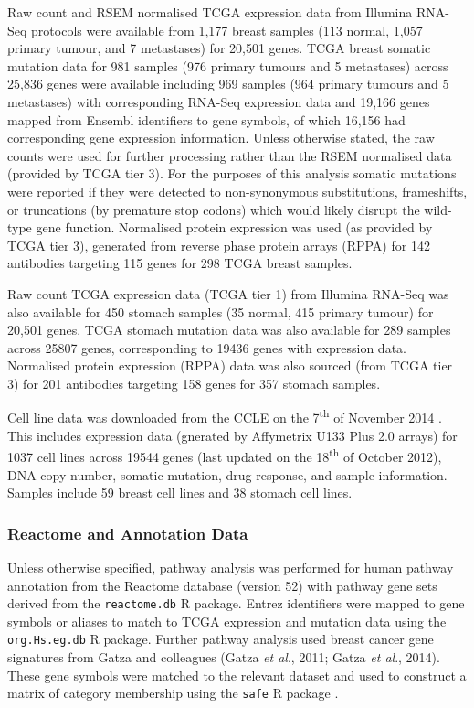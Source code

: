 Raw count and RSEM normalised \gls{TCGA} expression data from Illumina RNA-Seq protocols were available from 1,177 breast samples (113 normal, 1,057 primary tumour, and 7 metastases) for 20,501 genes. \gls{TCGA} breast somatic mutation data for 981 samples (976 primary tumours and 5 metastases) across 25,836 genes were available including 969 samples (964 primary tumours and 5 metastases) with corresponding RNA-Seq expression data and 19,166 genes mapped from Ensembl identifiers to gene symbols, of which 16,156 had corresponding gene expression information. Unless otherwise stated, the raw counts were used for further processing rather than the RSEM normalised data (provided by \gls{TCGA} tier 3). For the purposes of this analysis somatic mutations were reported if they were detected to non-synonymous substitutions, frameshifts, or truncations (by premature stop codons) which would likely disrupt the wild-type gene function. Normalised protein expression was used (as provided by \gls{TCGA} tier 3), generated from reverse phase protein arrays (RPPA) for 142 antibodies targeting 115 genes for 298 \gls{TCGA} breast samples.

Raw count \gls{TCGA} expression data (\gls{TCGA} tier 1) from Illumina RNA-Seq was also available for 450 stomach samples (35 normal, 415 primary tumour) for 20,501 genes. \gls{TCGA} stomach mutation data was also available for 289 samples across 25807 genes, corresponding to 19436 genes with expression data. Normalised protein expression (RPPA) data was also sourced (from \gls{TCGA} tier 3) for 201 antibodies targeting 158 genes for 357 stomach samples.

Cell line data was downloaded from the \gls{CCLE} on the 7\textsuperscript{th} of November 2014 \citep{Barretina2012, CCLE}. This includes expression data (gnerated by Affymetrix U133 Plus 2.0 arrays) for 1037 cell lines across 19544 genes (last updated on the 18\textsuperscript{th} of October 2012), DNA copy number, somatic mutation, drug response, and sample information. Samples include 59 breast cell lines and 38 stomach cell lines.


\subsubsection{Reactome and Annotation Data} \label{methods:gene_set}

Unless otherwise specified, pathway analysis was performed for human pathway annotation from the Reactome database (version 52) with pathway gene sets derived from the \texttt{reactome.db} R package. Entrez identifiers were mapped to gene symbols or aliases to match to \gls{TCGA} expression and mutation data using the \texttt{org.Hs.eg.db} R package. Further pathway analysis used breast cancer gene signatures from Gatza and colleagues (Gatza \textit{et al}., 2011; Gatza \textit{et al}., 2014). These gene symbols were matched to the relevant dataset and used to construct a matrix of category membership using the \texttt{safe} R package \citep{safe}.

